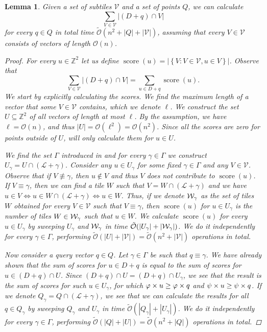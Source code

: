 \documentclass[11pt, letterpaper]{article}
\theoremstyle{plain}
\newtheorem{lemma}{Lemma}
\theoremstyle{definition}
\theoremstyle{remark}
\newcommand{\Z}{\mathbb{Z}}
\renewcommand{\O}{\mathcal{O}}
\newcommand{\tO}{\tilde{\mathcal{O}}}
\newcommand{\V}{\mathcal{V}}
\renewcommand{\L}{\mathcal{L}}
\newcommand{\set}[1]{\left\lbrace #1 \right\rbrace}
\DeclareMathOperator*{\score}{score}
\begin{document}
\begin{lemma}\label{primitive_conv}
	Given a set of subtiles $\V$ and a set of points $Q$, we can calculate
	\[ \sum_{V \in \V} |(D + q) \cap V| \]
	for every $q \in Q$ in total time $\tO(n^2 + |Q| + |\V|)$, assuming that every $V \in \V$ consists of vectors of length $\O(n)$.
	\begin{proof}
		For every $u \in \Z^2$ let us define $\score(u) = |\set{V : V \in \V, u \in V}|$. Observe that
		\[ \sum_{V \in \V} |(D + q) \cap V| = \sum_{u \in D + q} \score(u). \]
		We start by explicitly calculating the scores.
		We find the maximum length of a vector that some $V \in \V$ contains, which we denote $\ell$.
		We construct the set $U \subseteq \Z^2$ of all vectors of length at most $\ell$.
		By the assumption, we have $\ell = \O(n)$, and thus $|U| = \O(\ell ^ 2) = \O(n ^ 2)$.
		Since all the scores are zero for points outside of $U$, will only calculate them for $u \in U$.
		
		We find the set $\Gamma$ introduced in  and for every $\gamma \in \Gamma$ we construct $U_\gamma = U \cap (\L + \gamma)$.
		Consider any $u \in U_\gamma$ for some fixed $\gamma \in \Gamma$ and any $V \in \V$.
		Observe that if $V \not \equiv \gamma$, then $u \not \in V$ and thus $V$ does not contribute to $\score(u)$.
		If $V \equiv \gamma$, then we can find a tile $W$ such that $V = W \cap (\L + \gamma)$ and we have
		$u \in V \Leftrightarrow u \in W \cap (\L + \gamma) \Leftrightarrow u \in W$.
		Thus, if we denote $\mathcal{W}_\gamma$ as the set of tiles $W$ obtained for every $V \in \V$ such that $V \equiv \gamma$, then $\score(u)$ for $u \in U_\gamma$ is the number of tiles $W \in \mathcal{W}_\gamma$ such that $u \in W$.
		We calculate $\score(u)$ for every $u \in U_\gamma$ by sweeping $U_\gamma$ and $\mathcal{W}_\gamma$ in time $\tO(|U_\gamma| + |\W_\gamma|)$.
		We do it independently for every $\gamma \in \Gamma$, performing $\tO(|U| + |\V|) = \tO(n^2 + |\V|)$ operations in total.

		Now consider a query vector $q \in Q$.
		Let $\gamma \in \Gamma$ be such that $q \equiv \gamma$.
		We have already shown that the sum of scores for $u \in D + q$ is equal to the sum of scores for $u \in (D + q) \cap U$.
		Since $(D + q) \cap U = (D + q) \cap U_\gamma$, we see that the result is the sum of scores for such $u \in U_\gamma$, for which $\varphi \times u \ge \varphi \times q$ and $\psi \times u \ge \psi \times q$.
		If we denote $Q_\gamma = Q \cap (\L + \gamma)$, we see that we can calculate the results for all $q \in Q_\gamma$ by sweeping $Q_\gamma$ and $U_\gamma$ in time $\tO(|Q_\gamma| + |U_\gamma|)$.
		We do it independently for every $\gamma \in \Gamma$, performing $\tO(|Q| + |U|) = \tO(n^2 + |Q|)$ operations in total.
	\end{proof}
\end{lemma}
\end{document}
